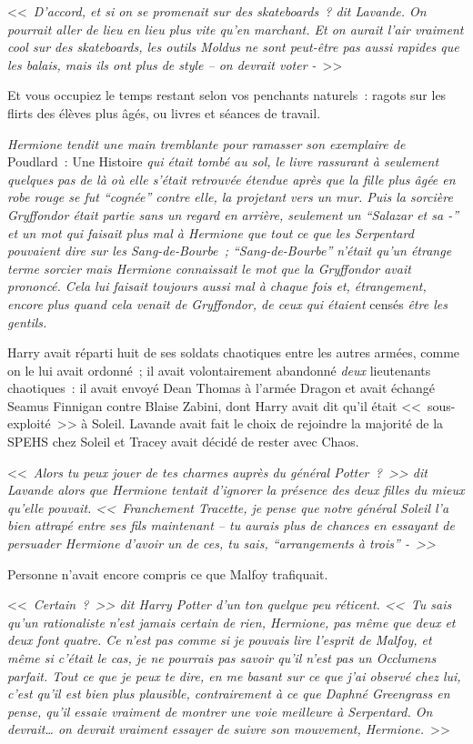 <<~\emph{D'accord, et si on se promenait sur des skateboards~? dit Lavande. On pourrait aller de lieu en lieu plus vite qu'en marchant. Et on aurait l'air vraiment cool sur des skateboards, les outils Moldus ne sont peut-être pas aussi rapides que les balais, mais ils ont plus de style -- on devrait voter -}~>>

Et vous occupiez le temps restant selon vos penchants naturels~: ragots sur les flirts des élèves plus âgés, ou livres et séances de travail.

\emph{Hermione tendit une main tremblante pour ramasser son exemplaire de} Poudlard~: Une Histoire \emph{qui était tombé au sol, le livre rassurant à seulement quelques pas de là où elle s'était retrouvée étendue après que la fille plus âgée en robe rouge se fut “cognée” contre elle, la projetant vers un mur. Puis la sorcière Gryffondor était partie sans un regard en arrière, seulement un “Salazar et sa -” et un mot qui faisait plus mal à Hermione que tout ce que les Serpentard pouvaient dire sur les Sang-de-Bourbe~; “Sang-de-Bourbe” n'était qu'un étrange terme sorcier mais Hermione connaissait le mot que la Gryffondor avait prononcé. Cela lui faisait toujours aussi mal à chaque fois et, étrangement, encore plus quand cela venait de Gryffondor, de ceux qui étaient} censés \emph{être les gentils.}

Harry avait réparti huit de ses soldats chaotiques entre les autres armées, comme on le lui avait ordonné~; il avait volontairement abandonné \emph{deux} lieutenants chaotiques~: il avait envoyé Dean Thomas à l'armée Dragon et avait échangé Seamus Finnigan contre Blaise Zabini, dont Harry avait dit qu'il était <<~sous-exploité~>> à Soleil. Lavande avait fait le choix de rejoindre la majorité de la SPEHS chez Soleil et Tracey avait décidé de rester avec Chaos.

<<~\emph{Alors tu peux jouer de tes charmes auprès du général Potter~?~>> dit Lavande alors que Hermione tentait d'ignorer la présence des deux filles du mieux qu'elle pouvait. <<~Franchement Tracette, je pense que notre général Soleil l'a bien attrapé entre ses fils maintenant -- tu aurais plus de chances en essayant de persuader Hermione d'avoir un de ces, tu sais, “arrangements à trois” -~>>}

Personne n'avait encore compris ce que Malfoy trafiquait.

<<~\emph{Certain~?~>> dit Harry Potter d'un ton quelque peu réticent. <<~Tu sais qu'un rationaliste n'est jamais certain de rien, Hermione, pas même que deux et deux font quatre. Ce n'est pas comme si je pouvais lire l'esprit de Malfoy, et même si c'était le cas, je ne pourrais pas savoir qu'il n'est pas un Occlumens parfait. Tout ce que je peux te dire, en me basant sur ce que j'ai observé chez lui, c'est qu'il est bien plus plausible, contrairement à ce que Daphné Greengrass en pense, qu'il essaie vraiment de montrer une voie meilleure à Serpentard. On devrait… on devrait vraiment essayer de suivre son mouvement, Hermione.}~>>

